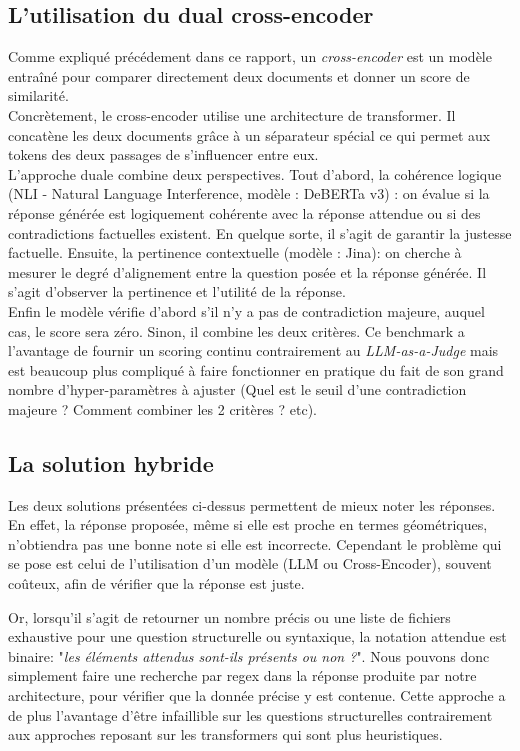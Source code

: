 \subsection{L'utilisation du dual cross-encoder}

Comme expliqué précédement dans ce rapport, un \textit{cross-encoder} est un modèle entraîné pour comparer directement deux documents et donner un score de similarité. 
\\

Concrètement, le cross-encoder utilise une architecture de transformer. Il concatène les deux documents grâce à un séparateur spécial ce qui permet aux tokens des deux passages de s'influencer entre eux. 
\\

L'approche duale combine deux perspectives. Tout d'abord, la cohérence logique (NLI - Natural Language Interference, modèle : DeBERTa v3) : on évalue si la réponse générée est logiquement cohérente avec la réponse attendue ou si des contradictions factuelles existent. En quelque sorte, il s'agit de garantir la justesse factuelle. Ensuite, la pertinence contextuelle (modèle : Jina): on cherche à mesurer le degré d'alignement entre la question posée et la réponse générée. Il s'agit d'observer la pertinence et l'utilité de la réponse. 
\\

Enfin le modèle vérifie d'abord s'il n'y a pas de contradiction majeure, auquel cas, le score sera zéro. Sinon, il combine les deux critères. Ce benchmark a l'avantage de fournir un scoring continu contrairement au \textit{LLM-as-a-Judge} mais est beaucoup plus compliqué à faire fonctionner en pratique du fait de son grand nombre d'hyper-paramètres à ajuster (Quel est le seuil d'une contradiction majeure ? Comment combiner les 2 critères ? etc).

\subsection{La solution hybride}

Les deux solutions présentées ci-dessus permettent de mieux noter les réponses. En effet, la réponse proposée, même si elle est proche en termes géométriques, n'obtiendra pas une bonne note si elle est incorrecte. Cependant le problème qui se pose est celui de l'utilisation d'un modèle (LLM ou Cross-Encoder), souvent coûteux, afin de vérifier que la réponse est juste.

Or, lorsqu'il s'agit de retourner un nombre précis ou une liste de fichiers exhaustive pour une question structurelle ou syntaxique, la notation attendue est binaire: "\textit{les éléments attendus sont-ils présents ou non ?}". Nous pouvons donc simplement faire une recherche par regex dans la réponse produite par notre architecture, pour vérifier que la donnée précise y est contenue. Cette approche a de plus l'avantage d'être infaillible sur les questions structurelles contrairement aux approches reposant sur les transformers qui sont plus heuristiques.
\\

